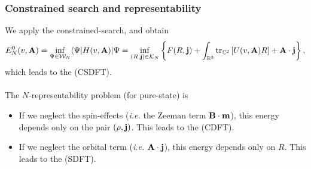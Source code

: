 \documentclass[9pt,xcolor=dvipsnames]{beamer}
\begin{document}
\begin{frame}

\frametitle{Constrained search and representability}

We apply the constrained-search, and obtain
\[
	E_N^0 (v, {\bold A}) = \inf_{\Psi \in {\mathcal W}_N} \langle \Psi | H(v, {\bold A}) | \Psi = \inf_{(R, {\bold j}) \in {\mathcal K}_N} \left\{ F(R, {\bold j}) + \int_{{\mathbb R}^3} {\rm tr}_{{\mathbb C}^2} \left[ U(v, {\bold A}) R \right] + {\bold A} \cdot {\bold j} \right\},
\]
which leads to the  (CSDFT).\\
~\\
 The $N$-representability problem (for pure-state) is
\begin{center}
\end{center}

\begin{itemize}
	\item If we neglect the spin-effects (\textit{i.e.} the Zeeman term ${\bold B} \cdot {\bold m}$), this energy depends only on the pair $(\rho, {\bold j})$. This leads to the  (CDFT).
	\item If we neglect the orbital term (\textit{i.e.} ${\bold A} \cdot {\bold j}$), this energy depends only on $R$. This leads to the  (SDFT).
\end{itemize}

\begin{center}
\end{center}


\end{frame}

\end{document}
